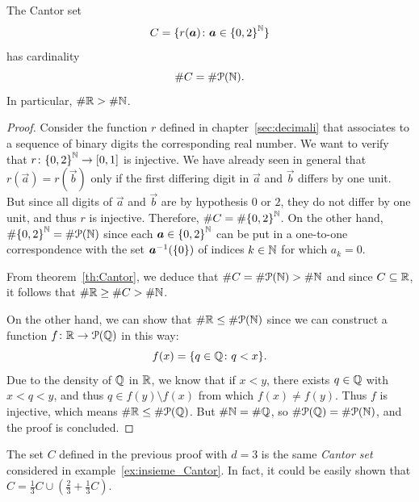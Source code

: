\begin{theorem}
  \label{th:cantor_secondo}
The Cantor set
\[
  C = \{r(\boldsymbol a)\colon \boldsymbol a \in {\left\{ 0,2 \right\}}^{\mathbb N}\}
\]
has cardinality
\[
\# C = \# \mathcal P({\mathbb N}).
\]
In particular, $\#{\mathbb R} > \#{\mathbb N}$.
\end{theorem}
%
\begin{proof}
Consider the function $r$ defined in chapter~\ref{sec:decimali} that associates 
to a sequence of binary digits the corresponding real number.
We want to verify that $r\colon {\left\{ 0,2 \right\}}^{\mathbb N} \to \left[0,1\right]$
is injective.
We have already seen in general that $r(\vec a) = r(\vec b)$ only 
if the first differing digit in $\vec a$ and $\vec b$ differs by one unit.
But since all digits of $\vec a$ and $\vec b$ are by hypothesis $0$ or 
$2$, they do not differ by one unit, and thus $r$ is injective.
Therefore, $\# C = \#{\left\{ 0,2 \right\}}^{\mathbb N}$.
On the other hand, $\#{\left\{ 0,2 \right\}}^{\mathbb N} = \#\mathcal P({\mathbb N})$ since 
each $\boldsymbol a \in {\left\{ 0,2 \right\}}^{\mathbb N}$ can be put in a one-to-one correspondence 
with the set $\boldsymbol a^{-1}({\left\{ 0 \right\}})$ of indices $k\in {\mathbb N}$
for which $a_k=0$.

From theorem~\ref{th:Cantor}, we deduce that $\# C = \#\mathcal P({\mathbb N}) > \#{\mathbb N}$ 
and since $C\subseteq {\mathbb R}$, it follows that $\# {\mathbb R} \ge \# C >\#{\mathbb N}$.

On the other hand, we can show that $\#{\mathbb R} \le \# \mathcal P({\mathbb N})$
since we can construct a function $f\colon {\mathbb R} \to \mathcal P({\mathbb Q})$
in this way:
\[
f(x) = {\left\{ q\in {\mathbb Q}\colon q<x \right\}}.
\]
Due to the density of ${\mathbb Q}$ in ${\mathbb R}$, we know that if $x<y$, 
there exists $q\in {\mathbb Q}$ with $x<q<y$, and thus $q\in f(y)\setminus f(x)$ 
from which $f(x)\neq f(y)$. 
Thus $f$ is injective, which means $\#{\mathbb R}\le \# \mathcal P({\mathbb Q})$.
But $\#{\mathbb N} = \#{\mathbb Q}$, so $\#\mathcal P({\mathbb Q}) = \#\mathcal P({\mathbb N})$, 
and the proof is concluded.
\end{proof}

The set $C$ defined in the previous proof with $d=3$ 
is the same \emph{Cantor set}%
%
% 
considered in example~\ref{ex:insieme_Cantor}.
In fact, it could be easily shown that 
$C=\frac 1 3 C \cup (\frac 2 3 + \frac 1 3 C)$.